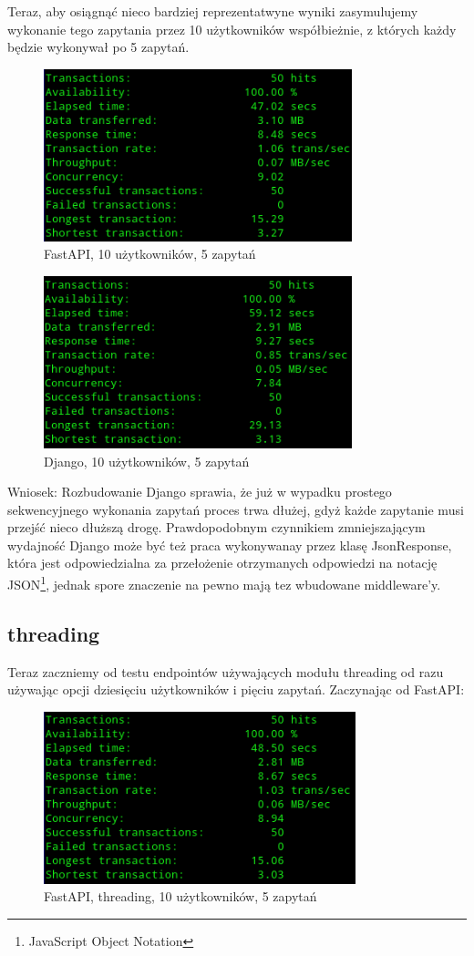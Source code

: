 Teraz, aby osiągnąć nieco bardziej reprezentatwyne wyniki zasymulujemy wykonanie tego zapytania przez 10 użytkowników współbieżnie, z których każdy będzie wykonywał po 5 zapytań.
\begin{figure}[H]
    \includegraphics[height=50mm]{zdjecia/10_req_sync_fast}
    \centering
    \caption{FastAPI, 10 użytkowników, 5 zapytań}
\end{figure}

\begin{figure}[H]
    \includegraphics[height=50mm]{zdjecia/10_req_sync_django}
    \centering
    \caption{Django, 10 użytkowników, 5 zapytań}
\end{figure}

Wniosek: Rozbudowanie Django sprawia, że już w wypadku prostego sekwencyjnego wykonania zapytań proces trwa dłużej, gdyż każde zapytanie musi przejść nieco dłuższą drogę. Prawdopodobnym czynnikiem zmniejszającym wydajność Django może być też praca wykonywanay przez klasę JsonResponse, która jest odpowiedzialna za przełożenie otrzymanych odpowiedzi na notację JSON\footnote{JavaScript Object Notation}, jednak spore znaczenie na pewno mają tez wbudowane middleware'y.

\subsection{threading}
Teraz zaczniemy od testu endpointów używających modułu threading od razu używając opcji dziesięciu użytkowników i pięciu zapytań. Zaczynając od FastAPI:
\begin{figure}[H]
    \includegraphics[height=50mm]{zdjecia/10_req_thread_fast}
    \centering
    \caption{FastAPI, threading, 10 użytkowników, 5 zapytań}
\end{figure}

